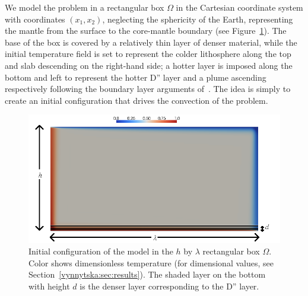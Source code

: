 We model the problem in a rectangular box $\Omega$ in the Cartesian
coordinate system with coordinates $(x_1, x_2)$, neglecting the
sphericity of the Earth, representing the mantle from the surface to
the core-mantle boundary (see Figure~\ref{vynnytska:fig:IC}). The base
of the box is covered by a relatively thin layer of denser material,
while the initial temperature field is set to represent the colder
lithosphere along the top and slab descending on the right-hand side;
a hotter layer is imposed along the bottom and left to represent the
hotter D'' layer and a plume ascending respectively following the
boundary layer arguments of~\citet{KekenEtAl1997}. The idea is simply
to create an initial configuration that drives the convection of the
problem.
\begin{figure}
   \center\includegraphics[width=0.95\columnwidth]{chapters/vynnytska/png/layout.png}
    \caption{Initial configuration of the model in the $h$ by
      $\lambda$ rectangular box $\Omega$. Color shows dimensionless
      temperature (for dimensional values, see
      Section~\ref{vynnytska:sec:results}). The shaded layer on the
      bottom with height $d$ is the denser layer corresponding to the
      D'' layer.}
  \label{vynnytska:fig:IC}
\end{figure}

